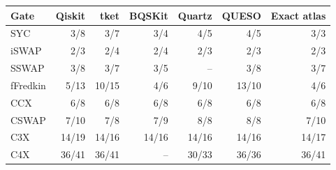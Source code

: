 \begin{center}\small\begin{tabular}{lrrrrrr}\toprule
Gate & Qiskit & tket & BQSKit & Quartz & QUESO & Exact atlas\\\midrule
SYC & 3/8 & 3/7 & 3/4 & 4/5 & 4/5 & 3/3\\
iSWAP & 2/3 & 2/4 & 2/4 & 2/3 & 2/3 & 2/3\\
SSWAP & 3/8 & 3/7 & 3/5 & -- & 3/8 & 3/7\\
fFredkin & 5/13 & 10/15 & 4/6 & 9/10 & 13/10 & 4/6\\
CCX & 6/8 & 6/8 & 6/8 & 6/8 & 6/8 & 6/8\\
CSWAP & 7/10 & 7/8 & 7/9 & 8/8 & 8/8 & 7/10\\
C3X & 14/19 & 14/16 & 14/16 & 14/16 & 14/16 & 14/17\\
C4X & 36/41 & 36/41 & -- & 30/33 & 36/36 & 36/41\\
\bottomrule\end{tabular}\end{center}
